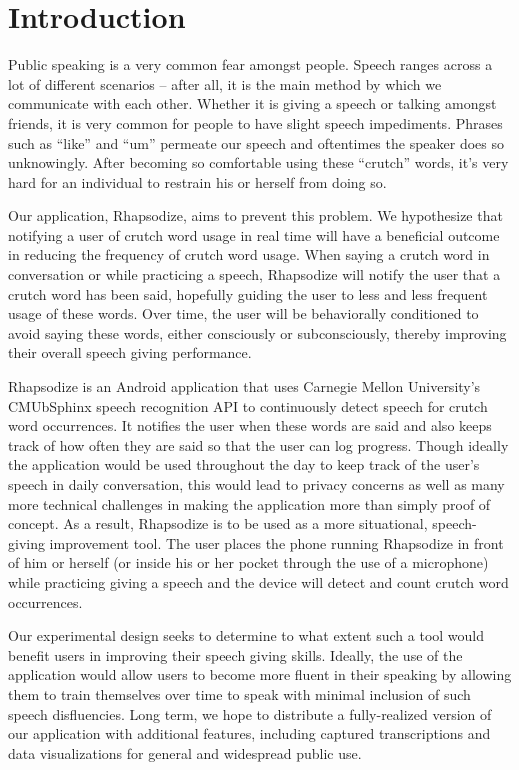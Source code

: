 \documentclass{sigchi}
\begin{document}

\section{Introduction}

Public speaking is a very common fear amongst people. Speech ranges across a lot of different scenarios – after all, it is the main method by which we communicate with each other. Whether it is giving a speech or talking amongst friends, it is very common for people to have slight speech impediments. Phrases such as “like” and “um” permeate our speech and oftentimes the speaker does so unknowingly. After becoming so comfortable using these “crutch” words, it’s very hard for an individual to restrain his or herself from doing so.

Our application, Rhapsodize, aims to prevent this problem. We hypothesize that notifying a user of crutch word usage in real time will have a beneficial outcome in reducing the frequency of crutch word usage. When saying a crutch word in conversation or while practicing a speech, Rhapsodize will notify the user that a crutch word has been said, hopefully guiding the user to less and less frequent usage of these words. Over time, the user will be behaviorally conditioned to avoid saying these words, either consciously or subconsciously, thereby improving their overall speech giving performance.

Rhapsodize is an Android application that uses Carnegie Mellon University’s CMUbSphinx speech recognition API to continuously detect speech for crutch word occurrences. It notifies the user when these words are said and also keeps track of how often they are said so that the user can log progress. Though ideally the application would be used throughout the day to keep track of the user’s speech in daily conversation, this would lead to privacy concerns as well as many more technical challenges in making the application more than simply proof of concept. As a result, Rhapsodize is to be used as a more situational, speech-giving improvement tool. The user places the phone running Rhapsodize in front of him or herself (or inside his or her pocket through the use of a microphone) while practicing giving a speech and the device will detect and count crutch word occurrences. 

Our experimental design seeks to determine to what extent such a tool would benefit users in improving their speech giving skills. Ideally, the use of the application would allow users to become more fluent in their speaking by allowing them to train themselves over time to speak with minimal inclusion of such speech disfluencies. Long term, we hope to distribute a fully-realized version of our application with additional features, including captured transcriptions and data visualizations for general and widespread public use.
\end{document}
